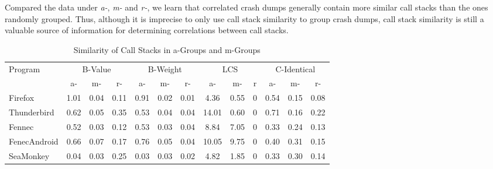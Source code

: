 Compared the data under {\it a-}, {\it m-} and {\it r-}, we learn that correlated crash dumps generally contain more similar call stacks than the ones randomly grouped. Thus, although it is imprecise to only use call stack similarity  to group crash dumps, call stack similarity is still a valuable source of information for determining correlations between call stacks.

\begin{table*}
\centering
\caption{Similarity of Call Stacks in a-Groups and m-Groups\label{tab:similar}}

\begin{tabular}{|l||c|c|c||c|c|c||c|c|c||c|c|c|}\hline

\multirow{2}{*}{Program}&\multicolumn{3}{|c||}{B-Value} & \multicolumn{3}{|c||}{B-Weight} & \multicolumn{3}{|c||}{LCS}&\multicolumn{3}{|c|}{C-Identical} \\\cline{2-13}

&a-&m-&r-&a-&m-&r-&a-&m-&r&a-&m-&r-\\\hline\hline

Firefox&1.01&0.04&0.11&0.91&0.02&0.01&4.36&0.55&0&0.54&0.15&0.08\\\hline
Thunderbird&0.62&0.05&0.35&0.53&0.04&0.04&14.01&0.60&0&0.71&0.16&0.22\\\hline
Fennec &0.52&0.03&0.12&0.53&0.03&0.04&8.84&7.05&0&0.33&0.24&0.13\\\hline
FenecAndroid&0.66&0.07&0.17&0.76&0.05&0.04&10.05&9.75&0&0.40&0.31&0.15\\\hline
SeaMonkey&0.04&0.03&0.25&0.03&0.03&0.02&4.82&1.85&0&0.33&0.30&0.14\\\hline

\end{tabular}

\end{table*}

 


